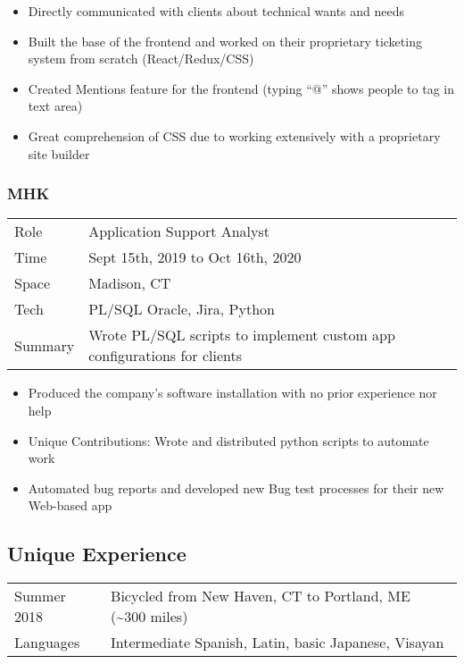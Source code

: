 \documentclass[letterpaper]{article}
\providecommand{\tightlist}{%
  \setlength{\itemsep}{0pt}\setlength{\parskip}{0pt}}
\begin{document}
\begin{itemize}
\tightlist
\item
  Directly communicated with clients about technical wants and needs
\item
  Built the base of the frontend and worked on their proprietary
  ticketing system from scratch (React/Redux/CSS)
\item
  Created Mentions feature for the frontend (typing ``@'' shows people
  to tag in text area)
\item
  Great comprehension of CSS due to working extensively with a
  proprietary site builder
\end{itemize}

\hypertarget{mhk}{%
\subsubsection{MHK}\label{mhk}}

\begin{longtable}[]{@{}
  >{\raggedright\arraybackslash}p{}
  >{\raggedright\arraybackslash}p{}@{}}
\toprule\noalign{}
\endhead
\bottomrule\noalign{}
\endlastfoot
Role & Application Support Analyst \\
Time & Sept 15th, 2019 to Oct 16th, 2020 \\
Space & Madison, CT \\
Tech & PL/SQL Oracle, Jira, Python \\
Summary & Wrote PL/SQL scripts to implement custom app configurations
for clients \\
\end{longtable}

\begin{itemize}
\tightlist
\item
  Produced the company's software installation with no prior experience
  nor help
\item
  Unique Contributions: Wrote and distributed python scripts to automate
  work
\item
  Automated bug reports and developed new Bug test processes for their
  new Web-based app
\end{itemize}

\hypertarget{unique-experience}{%
\subsection{Unique Experience}\label{unique-experience}}

\begin{longtable}[]{@{}
  >{\raggedright\arraybackslash}p{}
  >{\raggedright\arraybackslash}p{}@{}}
\toprule\noalign{}
\endhead
\bottomrule\noalign{}
\endlastfoot
Summer 2018 & Bicycled from New Haven, CT to Portland, ME
(\textasciitilde300 miles) \\
Languages & Intermediate Spanish, Latin, basic Japanese, Visayan \\
\end{longtable}
\end{document}

